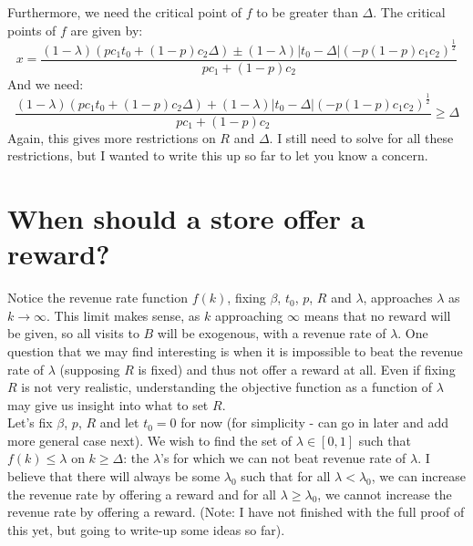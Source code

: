 Furthermore, we need the critical point of $f$ to be greater than $\Delta$. The critical points of $f$ are given by:
\begin{equation*}
x = \frac{(1-\lambda)(pc_1t_0+(1-p)c_2\Delta) \pm (1-\lambda)|t_0-\Delta|(-p(1-p)c_1c_2)^{\frac{1}{2}}}{pc_1+(1-p)c_2}
\end{equation*}
And we need:
\begin{equation*}
\frac{(1-\lambda)(pc_1t_0+(1-p)c_2\Delta) + (1-\lambda)|t_0-\Delta|(-p(1-p)c_1c_2)^{\frac{1}{2}}}{pc_1+(1-p)c_2} \geq \Delta
\end{equation*}
Again, this gives more restrictions on $R$ and $\Delta$. I still need to solve for all these restrictions, but I wanted to write this up so far to let you know a concern.

\section{When should a store offer a reward?}

Notice the revenue rate function $f(k)$, fixing $\beta$, $t_0$, $p$, $R$ and $\lambda$, approaches $\lambda$ as $k \rightarrow \infty$. This limit makes sense, as $k$ approaching $\infty$ means that no reward will be given, so all visits to $B$ will be exogenous, with a revenue rate of $\lambda$. One question that we may find interesting is when it is impossible to beat the revenue rate of $\lambda$ (supposing $R$ is fixed) and thus not offer a reward at all. Even if fixing $R$ is not very realistic, understanding the objective function as a function of $\lambda$ may give us insight into what to set $R$. \\

Let's fix $\beta$, $p$, $R$ and let $t_0 = 0$ for now (for simplicity - can go in later and add more general case next). We wish to find the set of $\lambda \in [0,1]$ such that $f(k) \leq \lambda$ on $k \geq \Delta$: the $\lambda$'s for which we can not beat revenue rate of $\lambda$. I believe that there will always be some $\lambda_0$ such that for all $\lambda < \lambda_0$, we can increase the revenue rate by offering a reward and for all $\lambda \geq \lambda_0$, we cannot increase the revenue rate by offering a reward. (Note: I have not finished with the full proof of this yet, but going to write-up some ideas so far). \\

